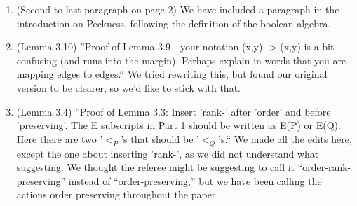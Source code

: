 \documentclass[10 pt]{amsart}
\theoremstyle{plain}
\theoremstyle{definition}
\theoremstyle{remark}
\numberwithin{equation}{section}
\begin{document}
\begin{enumerate}
	\item (Second to last paragraph on page 2) We have included a paragraph in the introduction on Peckness, following the definition of the boolean algebra.
	\item (Lemma 3.10) ''Proof of Lemma 3.9 - your notation (x,y) -> (x,y) is a bit confusing (and runs into the margin). Perhaps explain in words that you are mapping edges to edges.`` We tried rewriting this, but found our original version to be clearer, so we'd like to stick with that.
	\item (Lemma 3.4) ''Proof of Lemma 3.3:  Insert 'rank-' after 'order' and before 'preserving'.  The E subscripts in Part 1 should be written as E(P) or E(Q).  Here there are two '$<_P$'s that should be '$<_Q$'s.``
We made all the edits here, except the one about inserting 'rank-', as we did not understand what suggesting. We thought the referee might be suggesting to call it ``order-rank-preserving'' instead of ``order-preserving,'' but we have been calling the actions order preserving throughout the paper.
\end{enumerate}
\end{document}

